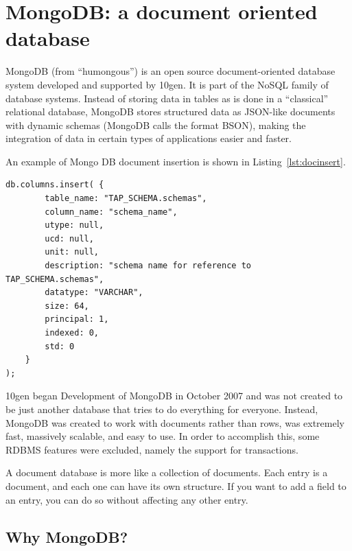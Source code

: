


\section{MongoDB: a document oriented database} %
\label{sec:mongodb_a_document_oriented_database}


MongoDB (from ``humongous'') is an open source document-oriented database system developed and supported by 10gen. It is part of the NoSQL family of database systems. Instead of storing data in tables as is done in a ``classical'' relational database, MongoDB stores structured data as JSON-like documents with dynamic schemas (MongoDB calls the format BSON), making the integration of data in certain types of applications easier and faster. 

An example of Mongo DB document insertion is shown in Listing~\ref{lst:docinsert}.

\begin{lstlisting}[float,label=lst:docinsert,caption=MongoDB column insertion example in JSON]
db.columns.insert( {
		table_name: "TAP_SCHEMA.schemas",
		column_name: "schema_name",
		utype: null,
		ucd: null,
		unit: null,
		description: "schema name for reference to TAP_SCHEMA.schemas",
		datatype: "VARCHAR",
		size: 64,
		principal: 1,
		indexed: 0,
		std: 0
	}
);
\end{lstlisting} 


10gen began Development of MongoDB in October 2007 and was not created to be just another database that tries to do everything for everyone. Instead, MongoDB was created to work with documents rather than rows, was extremely fast, massively scalable, and easy to use. In order to accomplish this, some
RDBMS
features were excluded, namely
the
support for transactions.

A document database is more like a collection of documents. Each entry is a document, and each one can have its own structure. If you want to add a field to an entry, you can do so without affecting any other entry.



\subsection{Why MongoDB?}

